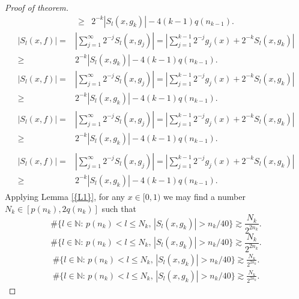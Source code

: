 \documentclass{amsart}
\numberwithin{equation}{section}
\begin{document}
\begin{proof}[Proof of theorem]
{\begin{gather}
\ge&2^{-k}|S_l(x,g_k)|-4(k-1)q(n_{k-1}).
\end{gather}\fi   
{}\begin{multline*}\label{c5}
|S_l(x,f)|=&\left|\sum_{j=1}^\infty2^{-j}S_l(x,g_j)\right|=\left|\sum_{j=1}^{k-1}2^{-j}g_j(x)+2^{-k}S_l(x,g_k)\right|\\
\ge&2^{-k}|S_l(x,g_k)|-4(k-1)q(n_{k-1}).
\end{multline*}\fi  
{}\begin{multline}\label{c5}
|S_l(x,f)|=&\left|\sum_{j=1}^\infty2^{-j}S_l(x,g_j)\right|=\left|\sum_{j=1}^{k-1}2^{-j}g_j(x)+2^{-k}S_l(x,g_k)\right|\\
\ge&2^{-k}|S_l(x,g_k)|-4(k-1)q(n_{k-1}).
\end{multline}\fi  
{}\begin{multline*}\begin{split}\label{c5}
|S_l(x,f)|=&\left|\sum_{j=1}^\infty2^{-j}S_l(x,g_j)\right|=\left|\sum_{j=1}^{k-1}2^{-j}g_j(x)+2^{-k}S_l(x,g_k)\right|\\
\ge&2^{-k}|S_l(x,g_k)|-4(k-1)q(n_{k-1}).
\end{split}\end{multline*}\fi
{}\begin{multline}\begin{split}\label{c5}
|S_l(x,f)|=&\left|\sum_{j=1}^\infty2^{-j}S_l(x,g_j)\right|=\left|\sum_{j=1}^{k-1}2^{-j}g_j(x)+2^{-k}S_l(x,g_k)\right|\\
\ge&2^{-k}|S_l(x,g_k)|-4(k-1)q(n_{k-1}).
\end{split}\end{multline}\fi
}
 Applying {Lemma \ref{{L1}}}, for any $x\in[0,1)$ we may find a number $N_k\in [p(n_k),2q(n_k)]$ such  that
{
\begin{equation*} 
\#\{l\in {\ensuremath{\mathbb N}}:\,p(n_k)<l\le N_k,\, |S_l(x,g_k)|>n_k/40 \}\gtrsim \frac{N_k}{2^{2n_k}}.
 \end{equation*}\fi  
{}\begin{equation}
\#\{l\in {\ensuremath{\mathbb N}}:\,p(n_k)<l\le N_k,\, |S_l(x,g_k)|>n_k/40 \}\gtrsim \frac{N_k}{2^{2n_k}}.
\end{equation}\fi   
{}\begin{align*}
\#\{l\in {\ensuremath{\mathbb N}}:\,p(n_k)<l\le N_k,\, |S_l(x,g_k)|>n_k/40 \}\gtrsim \frac{N_k}{2^{2n_k}}.
\end{align*}\fi   
{}\begin{align}
\#\{l\in {\ensuremath{\mathbb N}}:\,p(n_k)<l\le N_k,\, |S_l(x,g_k)|>n_k/40 \}\gtrsim \frac{N_k}{2^{2n_k}}.

\end{align}}
\end{proof}
\end{document}
